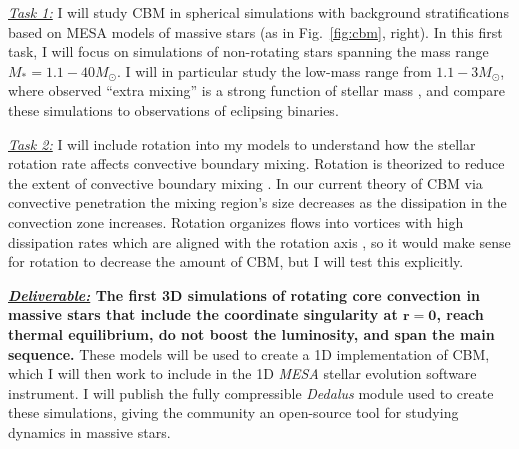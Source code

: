 \documentclass[11pt]{amsart} %
\theoremstyle{definition}
\numberwithin{equation}{section}
\begin{document}
\emph{\underline{Task 1:}}
I will study CBM in spherical simulations with background stratifications based on MESA models of massive stars (as in Fig.~\ref{fig:cbm}, right).
In this first task, I will focus on simulations of non-rotating stars spanning the mass range $M_* = 1.1-40 M_{\odot}$.
I will in particular study the low-mass range from $1.1-3 M_{\odot}$, where observed ``extra mixing'' is a strong function of stellar mass \citep[][Fig.~\ref{fig:intro}, middle]{claret_torres_2019}, and compare these simulations to observations of eclipsing binaries.

\emph{\underline{Task 2:}} I will include rotation into my models to understand how the stellar rotation rate affects convective boundary mixing.
Rotation is theorized to reduce the extent of convective boundary mixing \citep{augustson_mathis_2019}.
In our current theory of CBM via convective penetration \citep{anders_etal_2022a} the mixing region's size decreases as the dissipation in the convection zone increases.
Rotation organizes flows into vortices with high dissipation rates which are aligned with the rotation axis \citep{julien_etal_1996}, so it would make sense for rotation to decrease the amount of CBM, but I will test this explicitly.

\textbf{\underline{\emph{Deliverable:}} The first 3D simulations of rotating core convection in massive stars that include the coordinate singularity at $\boldsymbol{r = 0}$, reach thermal equilibrium, do not boost the luminosity, and span the main sequence.}
These models will be used to create a 1D implementation of CBM, which I will then work to include in the 1D \emph{MESA} stellar evolution software instrument.
I will publish the fully compressible \emph{Dedalus} module used to create these simulations, giving the community an open-source tool for studying dynamics in massive stars. 
\end{document}
